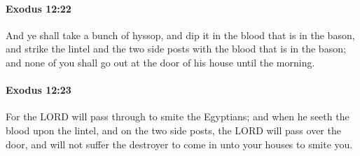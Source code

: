 		\paragraph{Exodus 12:22} %
			\label{EXODUS-12-22}

			And ye shall take a bunch of hyssop, and dip it in the blood that is in the bason, and strike the lintel and the two side posts with the blood that is in the bason; and none of you shall go out at the door of his house until the morning.


		\paragraph{Exodus 12:23} %
			\label{EXODUS-12-23}

			For the LORD will pass through to smite the Egyptians; and when he seeth the blood upon the lintel, and on the two side posts, the LORD will pass over the door, and will not suffer the destroyer to come in unto your houses to smite you.

